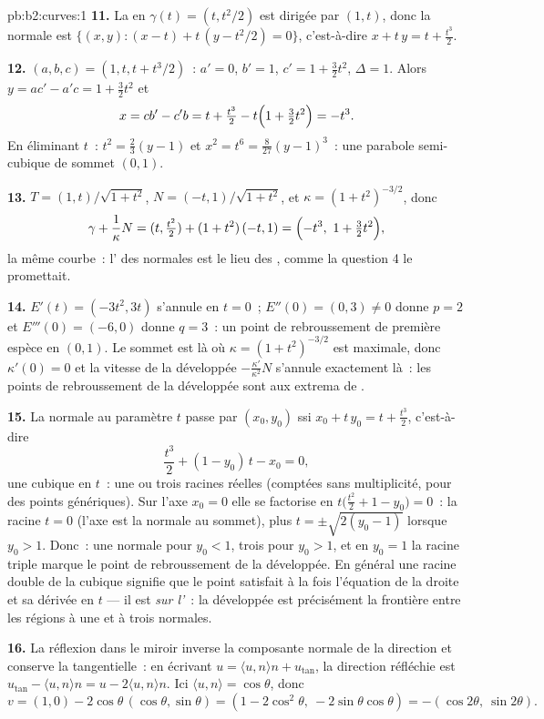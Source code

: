 \begin{solution}{pb:b2:curves:1}
\textbf{11.} La  en $\gamma(t) = (t, t^2/2)$ est
dirigée par $(1, t)$, donc la normale est $\{(x, y) : (x -
t) + t\,(y - t^2/2) = 0\}$, c'est-à-dire $x + t\,y = t +
\tfrac{t^3}2$.

\textbf{12.} $(a, b, c) = (1, t, t + t^3/2)$~: $a' = 0$, $b' =
1$, $c' = 1 + \tfrac32 t^2$, $\Delta = 1$. Alors $y = ac' -
a'c = 1 + \tfrac32t^2$ et
\[
x = cb' - c'b = t + \tfrac{t^3}2 - t\Bigl(1 +
\tfrac32t^2\Bigr) = -t^3 .
\]
En éliminant $t$~: $t^2 = \tfrac23(y - 1)$ et $x^2 = t^6 =
\tfrac8{27}(y - 1)^3$~: une parabole semi-cubique de sommet
$(0, 1)$.

\textbf{13.} $T = (1, t)/\sqrt{1+t^2}$, $N = (-t,
1)/\sqrt{1+t^2}$, et $\kappa = (1+t^2)^{-3/2}$, donc
\[
\gamma + \frac1\kappa N = (t, \tfrac{t^2}2) +
(1+t^2)\,(-t, 1) = \Bigl(-t^3,\ 1 + \tfrac32t^2\Bigr),
\]
la même courbe~: l' des normales est le lieu des
, comme la question 4 le promettait.

\textbf{14.} $E'(t) = (-3t^2, 3t)$ s'annule en $t = 0$~;
$E''(0) = (0, 3) \neq 0$ donne $p = 2$ et $E'''(0) = (-6,
0)$ donne $q = 3$~: un point de rebroussement de première espèce
en $(0, 1)$. Le
sommet est là où $\kappa = (1+t^2)^{-3/2}$ est maximale, donc
$\kappa'(0) = 0$ et la vitesse de la développée
$-\frac{\kappa'}{\kappa^2}N$ s'annule exactement là~: les
points de rebroussement de la développée sont aux extrema de
.

\textbf{15.} La normale au paramètre $t$ passe par
$(x_0, y_0)$ ssi $x_0 + t\,y_0 = t + \tfrac{t^3}2$,
c'est-à-dire
\[
\frac{t^3}2 + (1 - y_0)\,t - x_0 = 0 ,
\]
une cubique en $t$~: une ou trois racines réelles (comptées sans
multiplicité, pour des points génériques). Sur l'axe $x_0 = 0$
elle se factorise en $t\bigl(\tfrac{t^2}2 + 1 - y_0\bigr) = 0$~: la
racine $t = 0$ (l'axe est la normale au sommet), plus
$t = \pm\sqrt{2(y_0 - 1)}$ lorsque $y_0 > 1$. Donc~: une normale
pour $y_0 < 1$, trois pour $y_0 > 1$, et en $y_0 = 1$ la
racine triple marque le point de rebroussement de la développée.
En général une
racine double de la cubique signifie que le point satisfait à la
fois l'équation de la droite et sa dérivée en $t$ --- il est
\emph{sur l'}~: la développée est précisément la
frontière entre les régions à une et à trois normales.

\textbf{16.} La réflexion dans le miroir inverse la composante
normale de la direction et conserve la tangentielle~: en
écrivant $u = \langle u, n\rangle n + u_{\mathrm{tan}}$, la
direction réfléchie est $u_{\mathrm{tan}} - \langle u,
n\rangle n = u - 2\langle u, n\rangle n$. Ici $\langle u,
n\rangle = \cos\theta$, donc
\[
v = (1, 0) - 2\cos\theta\,(\cos\theta, \sin\theta)
= (1 - 2\cos^2\theta,\ -2\sin\theta\cos\theta)
= -(\cos2\theta,\ \sin2\theta).
\]


\end{solution}
